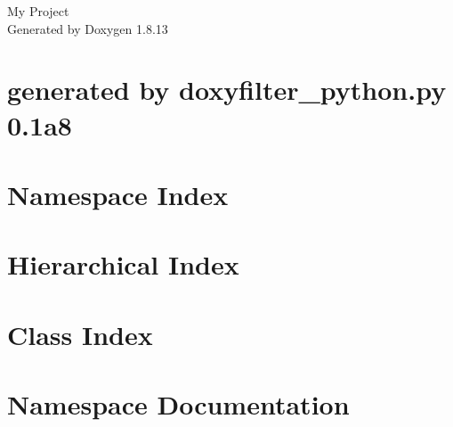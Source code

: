 \documentclass[twoside]{book}
\newcommand{\+}{\discretionary{\mbox{\scriptsize$\hookleftarrow$}}{}{}}
\newcommand{\clearemptydoublepage}{%
  \newpage{\pagestyle{empty}\cleardoublepage}%
}
\begin{document}
\hypersetup{pageanchor=false,
             bookmarksnumbered=true,
             pdfencoding=unicode
            }
\begin{titlepage}
\vspace*{7cm}
\begin{center}%
{\Large My Project }\\
\vspace*{1cm}
{\large Generated by Doxygen 1.8.13}\\
\end{center}
\end{titlepage}
\clearemptydoublepage
{}
\tableofcontents
\clearemptydoublepage
{}
\hypersetup{pageanchor=true}

\chapter{generated by doxyfilter\+\_\+python.\+py 0.1a8}
\label{md_wrappers_README}

\chapter{Namespace Index}

\chapter{Hierarchical Index}

\chapter{Class Index}

\chapter{Namespace Documentation}



\end{document}
